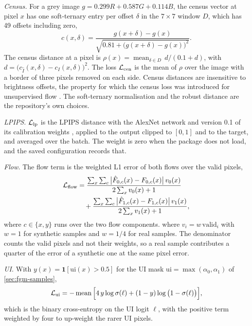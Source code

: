 \emph{Census.} For a grey image $g=0.299R+0.587G+0.114B$, the census vector at pixel $x$ has one soft-ternary entry per offset $\delta$ in the $7\times7$ window $D$, which has 49 offsets including zero,
\begin{equation}
c(x,\delta)=\frac{g(x+\delta)-g(x)}{\sqrt{0.81+\big(g(x+\delta)-g(x)\big)^2}}.\label{eq:fgm-census}
\end{equation}
The census distance at a pixel is $\rho(x)=\operatorname{mean}_{\delta\in D}\,d/(0.1+d)$, with $d=\big(c_{\hat I}(x,\delta)-c_{I}(x,\delta)\big)^2$. The loss $\mathcal L_{\rm cen}$ is the mean of $\rho$ over the image with a border of three pixels removed on each side. Census distances are insensitive to brightness offsets, the property for which the census loss was introduced for unsupervised flow \cite{meister2018unflow}. The soft-ternary normalisation and the robust distance are the repository's own choices.

\emph{LPIPS.} $\mathcal L_{\rm lp}$ is the LPIPS distance with the AlexNet network and version 0.1 of its calibration weights \cite{zhang2018lpips}, applied to the output clipped to $[0,1]$ and to the target, and averaged over the batch. The weight is zero when the package does not load, and the saved configuration records that.

\emph{Flow.} The flow term is the weighted L1 error of both flows over the valid pixels,
\begin{align}
\mathcal L_{\rm flow}&=\frac{\sum_x\sum_{c}\big|\hat F_{0,c}(x)-F_{0,c}(x)\big|\,v_0(x)}{2\sum_x v_0(x)+1}\nonumber\\
&\quad+\frac{\sum_x\sum_{c}\big|\hat F_{1,c}(x)-F_{1,c}(x)\big|\,v_1(x)}{2\sum_x v_1(x)+1},\label{eq:fgm-flow}
\end{align}
where $c\in\{x,y\}$ runs over the two flow components.
where $v_i=w\,\mathrm{valid}_i$ with $w=1$ for synthetic samples and $w=1/4$ for real samples. The denominator counts the valid pixels and not their weights, so a real sample contributes a quarter of the error of a synthetic one at the same pixel error.

\emph{UI.} With $y(x)=\mathbf 1[\mathrm{ui}(x)>0.5]$ for the UI mask $\mathrm{ui}=\max(\alpha_0,\alpha_1)$ of \cref{sec:fgm-samples},
\begin{equation}
\mathcal L_{\rm ui}=-\operatorname{mean}\Big[4\,y\log\sigma(\ell)+(1-y)\log\big(1-\sigma(\ell)\big)\Big],\label{eq:fgm-ui-bce}
\end{equation}
which is the binary cross-entropy on the UI logit $\ell$, with the positive term weighted by four to up-weight the rarer UI pixels.

